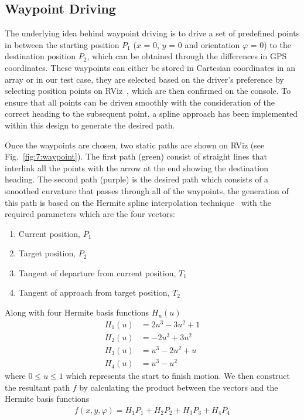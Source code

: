\subsection{Waypoint Driving}\label{sec:7:waypoint}
The underlying idea behind waypoint driving is to drive a set of predefined points in between the starting position $P_1$ ($x$ = 0, $y$ = 0 and orientation $\varphi$ = 0) to the destination position $P_2$, which can be obtained through the differences in GPS coordinates. These waypoints can either be stored in Cartesian coordinates in an array or in our test case, they are selected based on the driver's preference by selecting position points on RViz~\cite{kam_rviz:_2015}, which are then confirmed on the console. To ensure that all points can be driven smoothly with the consideration of the correct heading to the subsequent point, a spline approach has been implemented within this design to generate the desired path.

Once the waypoints are chosen, two static paths are shown on RViz (see Fig.~\ref{fig:7:waypoint}). The first path (green) consist of straight lines that interlink all the points with the arrow at the end showing the destination heading. The second path (purple) is the desired path which consists of a smoothed curvature that passes through all of the waypoints, the generation of this path is based on the Hermite spline interpolation technique~\cite{de_boor_practical_1978} with the required parameters which are the four vectors:
\begin{enumerate}
    \item Current position, $P_1$
    \item Target position, $P_2$
    \item Tangent of departure from current position, $T_1$
    \item Tangent of approach from target position, $T_2$
\end{enumerate}
Along with four Hermite basis functions $H_n(u)$
\begin{subequations}
	\label{eqn:hermitebasis}
	\begin{align}
	H_1(u) &= 2u^3-3u^2+1 \\
	H_2(u) &= -2u^3+3u^2 \\
	H_3(u) &= u^3-2u^2+u \\
	H_4(u) &= u^3-u^2
	\end{align}
\end{subequations}
where $0 \leq u \leq 1$ which represents the start to finish motion. We then construct the resultant path $f$ by calculating the product between the vectors and the Hermite basis functions
\begin{align}\label{eqn:hermite}
f(x,y,\varphi) = H_1P_1 + H_2P_2 + H_3P_3 + H_4P_4
\end{align}


